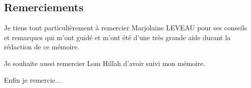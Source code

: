 \begin{center}
\subsection*{Remerciements}
\end{center}

\hskip7mm

\begin{spacing}{1.3}
Je tiens tout particulièrement à remercier Marjolaine {LEVEAU} pour ses conseils et remarques qui m'ont guidé et m'ont été d'une très grande aide durant la rédaction de ce mémoire.

Je souhaite aussi remercier Lom Hillah  d'avoir suivi mon mémoire.

Enfin je remercie... 
\end{spacing}